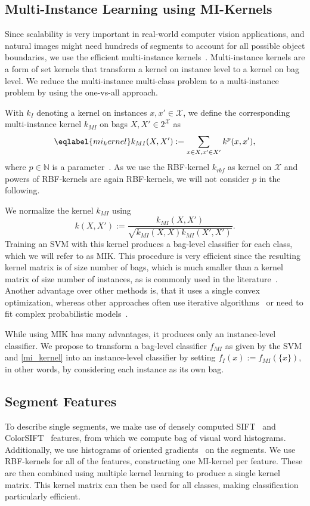 \documentclass{llncs} %
\begin{document}
\subsection{Multi-Instance Learning using MI-Kernels}
Since scalability is very important in real-world computer vision
applications, and natural images might need hundreds of segments to
account for all possible object boundaries, we use the efficient
multi-instance kernels~\citep{gaertner2002multi}.
Multi-instance kernels are a form of set kernels that transform a kernel
on instance level to a kernel on bag level.
We reduce the multi-instance multi-class problem to a multi-instance problem by using the one-vs-all approach.

With $k_I$ denoting a kernel on instances $x,x' \in \mathcal{X}$, we define the corresponding multi-instance kernel $k_{MI}$ on bags $X,X' \in 2^\mathcal{X}$
as
\begin{equation}\eqlabel{mi_kernel}
k_{MI}(X,X') := \sum_{x \in X, x' \in X'} k^p(x,x'),
\end{equation}
where $p \in \mathbb{N}$ is a parameter~\citep{gaertner2002multi}. As we use the RBF-kernel $k_{rbf}$ as kernel on $\mathcal{X}$ and powers of RBF-kernels
are again RBF-kernels, we will not consider $p$ in the following.

We normalize the kernel $k_{MI}$ \citep{gaertner2002multi} using
\begin{equation}
k(X,X') := \frac{k_{MI}(X,X')}{\sqrt{k_{MI}(X,X)k_{MI}(X',X')}}.
\end{equation}
Training an SVM with this kernel produces a bag-level classifier for each class, which we will refer to as MIK.
This procedure is very efficient since the resulting kernel matrix is of size
number of bags, which is much smaller than a kernel matrix of size number of
instances, as is commonly used in the
literature~\citep{andrews2003support,nguyen2010new,zhang2008m3miml}.  Another
advantage over other methods is, that it uses a single convex optimization,
whereas other approaches often use iterative algorithms~\citep{andrews2003support} or need to fit complex
probabilistic models~\citep{zha2008joint}.

While using MIK has many advantages, it produces only an instance-level
classifier. We propose to transform a bag-level classifier $f_{MI}$ as given by
the SVM and \eqref{mi_kernel} into an instance-level classifier by setting
$f_{I}(x):=f_{MI}(\{x\})$, in other words, by considering each instance as its own
bag. 

\subsection{Segment Features}
To describe single segments, we make use of densely computed SIFT~\citep{lowe2004distinctive} and ColorSIFT~\citep{van2009evaluating} features, from which
we compute bag of visual word histograms. Additionally, we use histograms of oriented gradients~\citep{dalal2005histograms} on the segments.
We use RBF-kernels for all of the features,
constructing one MI-kernel per feature. These are then combined using multiple kernel
learning to produce a single kernel matrix. This kernel matrix can then be used for all classes,
making classification particularly efficient.
\end{document}
